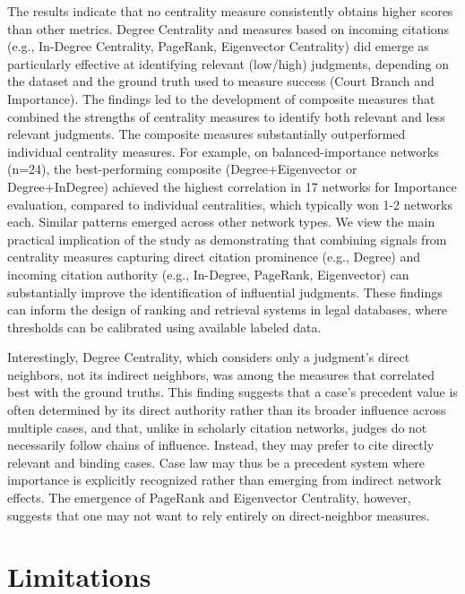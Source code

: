 \documentclass[sigconf,authordraft]{acmart}
\begin{document}
The results indicate that no centrality measure consistently obtains higher scores than other metrics. Degree Centrality and measures based on incoming citations (e.g., In-Degree Centrality, PageRank, Eigenvector Centrality) did emerge as particularly effective at identifying relevant (low/high) judgments, depending on the dataset and the ground truth used to measure success (Court Branch and Importance). The findings led to the development of composite measures that combined the strengths of centrality measures to identify both relevant and less relevant judgments.
The composite measures substantially outperformed individual centrality measures. For example, on balanced-importance networks (n=24), the best-performing composite (Degree+Eigenvector or Degree+InDegree) achieved the highest correlation in 17 networks for Importance evaluation, compared to individual centralities, which typically won 1-2 networks each. Similar patterns emerged across other network types.
We view the main practical implication of the study as demonstrating that combining signals from centrality measures capturing direct citation prominence (e.g., Degree) and incoming citation authority (e.g., In-Degree, PageRank, Eigenvector) can substantially improve the identification of influential judgments. These findings can inform the design of ranking and retrieval systems in legal databases, where thresholds can be calibrated using available labeled data.

Interestingly, Degree Centrality, which considers only a judgment's direct neighbors, not its indirect neighbors, was among the measures that correlated best with the ground truths. This finding suggests that a case's precedent value is often determined by its direct authority rather than its broader influence across multiple cases, and that, unlike in scholarly citation networks, judges do not necessarily follow chains of influence. Instead, they may prefer to cite directly relevant and binding cases. Case law may thus be a precedent system where importance is explicitly recognized rather than emerging from indirect network effects. The emergence of PageRank and Eigenvector Centrality, however, suggests that one may not want to rely entirely on direct-neighbor measures.


\section{Limitations}
\end{document}
